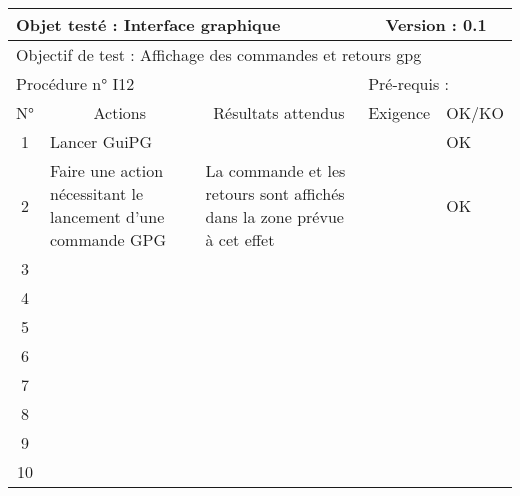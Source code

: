 \documentclass{../res/univ-projet}
\begin{document}
\begin{center}
    \begin{tabular}{|c|p{5cm}|p{5cm}|p{1.5cm}|p{1.5cm}|}
      \hline
      \multicolumn{3}{|l|}{Objet testé : Interface graphique} & \multicolumn{2}{c|}{Version : 0.1}\\ \hline
      \multicolumn{5}{|l|}{Objectif de test : Affichage des commandes et retours gpg}\\ \hline
      \multicolumn{3}{|l|}{Procédure n° I12} & \multicolumn{2}{p{3cm}|}{Pré-requis : }\\ \hline
      \multicolumn{1}{|c|}{N°} & \multicolumn{1}{c|}{Actions} & \multicolumn{1}{c|}{Résultats attendus} & 
      \multicolumn{1}{c|}{Exigence} & \multicolumn{1}{c|}{OK/KO}\\ \hline
      1 & Lancer GuiPG &  &  & OK \\
      2 & Faire une action nécessitant le lancement d'une commande GPG & La commande et les retours sont affichés dans la zone prévue à cet effet &  & OK \\
      3 &  &  &  & \\ 
      4 &  &  &  & \\
      5 &  &  &  & \\
      6 &  &  &  & \\
      7 &  &  &  & \\
      8 &  &  &  & \\
      9 &  &  &  & \\
      10 &  &  &  &\\ 
	\hline
    \end{tabular}
    \vskip 2.2cm


\end{center}
\end{document}
